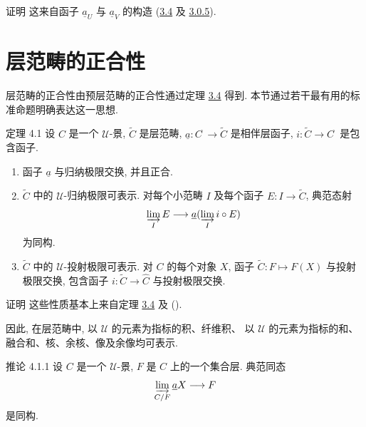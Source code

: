 \begin{enonce*}[remark]{证明}
这来自函子 $\underline{a}_U$ 与 $\underline{a}_V$ 的构造
(\hyperref[II.theo3.4]{3.4} 及 \hyperref[II.subsubsec3.0.5]{3.0.5}).
\end{enonce*}




\section{层范畴的正合性}

层范畴的正合性由预层范畴的正合性通过定理
\hyperref[II.theo3.4]{3.4} 得到.
本节通过若干最有用的标准命题明确表达这一思想.

\begin{enonce*}{定理 4.1}
设 $C$ 是一个 $𝒰$-景, $\widetilde{C}$ 是层范畴,
$\underline{a}:C^{\widehat{\phantom{,}}}\rightarrow
\widetilde{C}$ 是相伴层函子,
$i:\widetilde{C}\rightarrow C^{\widehat{\phantom{,}}}$ 是包含函子.
\begin{enumerate}
\renewcommand{\labelenumi}{\theenumi)}
\item 函子 $\underline{a}$ 与归纳极限交换, 并且正合.

\item $\widetilde{C}$ 中的\pageoriginale{} $𝒰$-归纳极限可表示.
对每个小范畴 $I$ 及每个函子 $E:I\rightarrow \widetilde{C}$,
典范态射
$$
\varinjlim_I E\longrightarrow \underline{a}(\varinjlim_I i\circ E)
$$
为同构.

\item $\widetilde{C}$ 中的 $𝒰$-投射极限可表示.
对 $C$ 的每个对象 $X$,
函子 $\widetilde{C}:F\mapsto F(X)$ 与投射极限交换,
\ie 包含函子 $i:\widetilde{C}\rightarrow \widehat{C}$ 与投射极限交换.
\end{enumerate}
\end{enonce*}

\begin{enonce*}[remark]{证明}
这些性质基本上来自定理 \hyperref[II.theo3.4]{3.4}
及 ().
\end{enonce*}

因此, 在层范畴中, 以 $𝒰$ 的元素为指标的积、纤维积、
以 $𝒰$ 的元素为指标的和、融合和、核、余核、像及余像均可表示.

\begin{enonce*}{推论 4.1.1}
设 $C$ 是一个 $𝒰$-景, $F$ 是 $C$ 上的一个集合层.
典范同态
$$
\varinjlim_{C/F} \underline{a}X\longrightarrow F
$$
是同构.
\end{enonce*}

